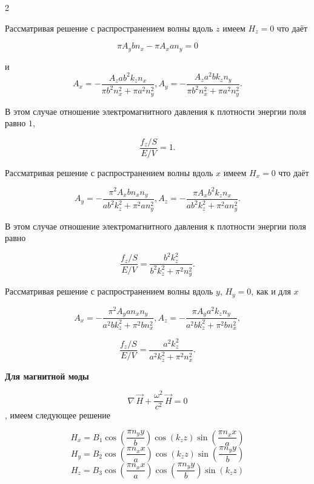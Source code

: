 \documentclass[twoside, 10pt]{article}
\begin{document}
\begin{multicols}{2}

    Рассматривая решение с распространением волны вдоль \(z\) имеем
\(H_z = 0\) что даёт

    \[\pi A_{y} b n_{x} - \pi A_{x} a n_{y} = 0\]

    и
\[A_{x} = -\frac{A_{z} a b^{2} k_{z} n_{x}}{\pi b^{2} n_{x}^{2} + \pi a^{2} n_{y}^{2}},
A_{y} = -\frac{A_{z} a^{2} b k_{z} n_{y}}{\pi b^{2} n_{x}^{2} + \pi a^{2} n_{y}^{2}}.\]

    В этом случае отношение электромагнитного давления к плотности энергии поля равно \(1\),

\begin{equation}\frac{f_z/S}{E/V} = 1.\end{equation}

    Рассматривая решение с распространением волны вдоль \(x\) имеем
\(H_x = 0\) что даёт

    \[A_{y} = -\frac{\pi^{2} A_{x} b n_{x} n_{y}}{a b^{2} k_{z}^{2} + \pi^{2} a n_{y}^{2}},
A_{z} = -\frac{\pi A_{x} b^{2} k_{z} n_{x}}{a b^{2} k_{z}^{2} + \pi^{2} a n_{y}^{2}}.\]

    В этом случае отношение электромагнитного давления к плотности энергии поля равно

\begin{equation}\frac{f_z/S}{E/V} = \frac{b^{2} k_{z}^{2}}{b^{2} k_{z}^{2} + \pi^{2} n_{y}^{2}}.\end{equation}

    Рассматривая решение с распространением волны вдоль \(y\),
\(H_y = 0\), как и для \(x\)

\[A_{x} = -\frac{\pi^{2} A_{y} a n_{x} n_{y}}{a^{2} b k_{z}^{2} + \pi^{2} b n_{x}^{2}},
A_{z} = -\frac{\pi A_{y} a^{2} k_{z} n_{y}}{a^{2} b k_{z}^{2} + \pi^{2} b n_{x}^{2}},\]

\begin{equation}\frac{f_z/S}{E/V} = \frac{a^{2} k_{z}^{2}}{a^{2} k_{z}^{2} + \pi^{2} n_{x}^{2}}.\end{equation}

    \textbf{Для магнитной моды}

\begin{equation}\nabla\,\vec{H} + \frac{\omega^2}{c^2}\,\vec{H} = 0\end{equation}, имеем следующее решение

    \[H_{x} = B_{1} \cos\left(\frac{\pi n_{y} y}{b}\right) \cos\left(k_{z} z\right) \sin\left(\frac{\pi n_{x} x}{a}\right)\]
\[H_{y} = B_{2} \cos\left(\frac{\pi n_{x} x}{a}\right) \cos\left(k_{z} z\right) \sin\left(\frac{\pi n_{y} y}{b}\right)\]
\[H_{z} = B_{3} \cos\left(\frac{\pi n_{x} x}{a}\right) \cos\left(\frac{\pi n_{y} y}{b}\right) \sin\left(k_{z} z\right)\]


\end{multicols}
\end{document}
